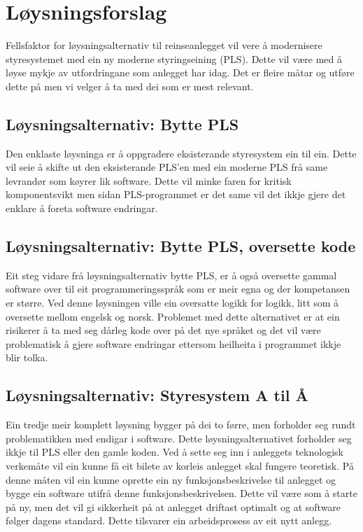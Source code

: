 \newpage
\section{Løysningsforslag}
Fellsfaktor for løysningsalternativ til reinseanlegget vil vere å modernisere 
styresystemet med ein ny moderne styringseining (PLS). 
Dette vil være med å løyse mykje av utfordringane som anlegget har idag. 
Det er fleire måtar og utføre dette på men vi velger å ta med dei som er mest relevant.
\newline
\subsection{Løysningsalternativ: Bytte PLS}
Den enklaste løysninga er å oppgradere eksisterande styresystem ein til ein. 
Dette vil seie å skifte ut den eksisterande PLS'en med ein moderne PLS frå same levrandør som køyrer lik software.
Dette vil minke faren for kritisk komponentsvikt men sidan PLS-programmet er det same vil det ikkje gjere det enklare å foreta
software endringar.

\subsection{Løysningsalternativ: Bytte PLS, oversette kode}
Eit steg vidare frå løysningsalternativ bytte PLS, er å også oversette gammal software over til eit programmeringsspråk
som er meir egna og der kompetansen er større. Ved denne løysningen ville ein oversatte logikk for logikk, litt som å
oversette mellom engelsk og norsk.\newline
Problemet med dette alternativet er at ein risikerer å ta med seg dårleg kode over på det nye språket og
det vil være problematisk å gjere software endringar ettersom heilheita i programmet ikkje blir tolka.

\subsection{Løysningsalternativ: Styresystem A til Å}
Ein tredje meir komplett løysning bygger på dei to førre, men forholder seg rundt problematikken med endigar i software.
Dette løysningsalternativet forholder seg ikkje til PLS eller den gamle koden.\newline
Ved å sette seg inn i anleggets teknologisk verkemåte vil ein kunne få eit bilete av korleis anlegget skal fungere teoretisk.
På denne måten vil ein kunne oprette ein ny funksjonsbeskrivelse til anlegget og bygge ein software utifrå denne funksjonsbeskrivelsen.
Dette vil være som å starte på ny, men det vil gi sikkerheit på at anlegget driftast optimalt og at software følger
dagens standard. Dette tilsvarer ein arbeidsprosess av eit nytt anlegg.

